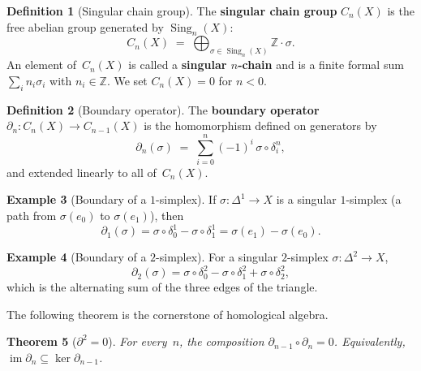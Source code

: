 \documentclass[12pt,a4paper,openany]{book}
\theoremstyle{definition}
\newtheorem{definition}{Definition}[chapter]
\newtheorem{example}[definition]{Example}
\theoremstyle{plain}
\newtheorem{theorem}[definition]{Theorem}
\theoremstyle{remark}
\newcommand{\Z}{\mathbb{Z}}
\DeclareMathOperator{\im}{im}
\begin{document}
\begin{definition}[Singular chain group]\label{def:chain-group}
The \textbf{singular chain group} $C_n(X)$ is the free abelian group
generated by $\operatorname{Sing}_n(X)$:
\[
  C_n(X) \;=\; \bigoplus_{\sigma\in\operatorname{Sing}_n(X)} \Z\cdot\sigma.
\]
An element of~$C_n(X)$ is called a \textbf{singular $n$-chain}
and is a finite formal sum $\sum_i n_i\sigma_i$ with $n_i\in\Z$.
We set $C_n(X)=0$ for $n<0$.
\end{definition}

\begin{definition}[Boundary operator]\label{def:boundary-operator}
The \textbf{boundary operator} $\partial_n\colon C_n(X)\to C_{n-1}(X)$
is the homomorphism defined on generators by
\[
  \partial_n(\sigma)
  \;=\;
  \sum_{i=0}^{n}(-1)^i\,\sigma\circ\delta_i^n,
\]
and extended linearly to all of~$C_n(X)$.
\end{definition}

\begin{example}[Boundary of a $1$-simplex]\label{ex:boundary-1-simplex}
If $\sigma\colon\Delta^1\to X$ is a singular $1$-simplex (a path from
$\sigma(e_0)$ to $\sigma(e_1)$), then
\[
  \partial_1(\sigma)
  = \sigma\circ\delta_0^1 - \sigma\circ\delta_1^1
  = \sigma(e_1) - \sigma(e_0).
\]
\end{example}

\begin{example}[Boundary of a $2$-simplex]\label{ex:boundary-2-simplex}
For a singular $2$-simplex $\sigma\colon \Delta^2\to X$,
\[
  \partial_2(\sigma)
  = \sigma\circ\delta_0^2 - \sigma\circ\delta_1^2 + \sigma\circ\delta_2^2,
\]
which is the alternating sum of the three edges of the triangle.
\end{example}

The following theorem is the cornerstone of homological algebra.

\begin{theorem}[$\partial^2=0$]\label{thm:boundary-squared-zero}
For every~$n$, the composition $\partial_{n-1}\circ\partial_n=0$.
Equivalently, $\im\partial_n\subseteq\ker\partial_{n-1}$.
\end{theorem}
\end{document}
